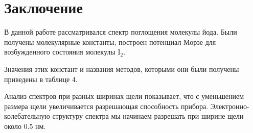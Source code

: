 \section{Заключение}
В данной работе рассматривался спектр поглощения молекулы йода. Были получены молекулярные константы, построен потенциал Морзе для возбужденного состояния молекулы $\text{I}_2$.

Значения этих констант и названия методов, которыми они были получены приведены в таблице 4.

Анализ спектров при разных ширинах щели показывает, что с уменьшением размера щели увеличивается разрешающая способность прибора. Электронно-колебательную структуру спектра мы начинаем разрешать при ширине щели около 0.5 нм.

